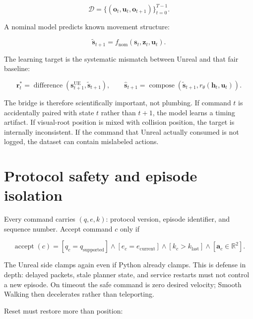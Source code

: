 \documentclass[11pt]{article}
\begin{document}
\begin{equation}
  \mathcal{D}=\{(\mathbf{o}_t,\mathbf{u}_t,\mathbf{o}_{t+1})\}_{t=0}^{T-1}.
\end{equation}

A nominal model predicts known movement structure:

\begin{equation}
  \tilde{\mathbf{s}}_{t+1}=
  f_{\mathrm{nom}}(\mathbf{s}_t,\mathbf{z}_t,\mathbf{u}_t).
\end{equation}

The learning target is the systematic mismatch between Unreal and that fair baseline:

\begin{equation}
  \mathbf{r}^{*}_t =
  \operatorname{difference}\!\left(\mathbf{s}^{\mathrm{UE}}_{t+1},
  \tilde{\mathbf{s}}_{t+1}\right),
  \qquad
  \hat{\mathbf{s}}_{t+1}=
  \operatorname{compose}\!\left(\tilde{\mathbf{s}}_{t+1},r_\theta(\mathbf{h}_t,\mathbf{u}_t)\right).
\end{equation}

The bridge is therefore scientifically important, not plumbing. If command $t$ is accidentally
paired with state $t$ rather than $t+1$, the model learns a timing artifact. If visual-root position
is mixed with collision position, the target is internally inconsistent. If the command that Unreal
actually consumed is not logged, the dataset can contain mislabeled actions.

\section{Protocol safety and episode isolation}\label{sec:safety}

Every command carries $(q,e,k)$: protocol version, episode identifier, and sequence number. Accept
command $c$ only if

\begin{equation}
  \operatorname{accept}(c)=
  [q_c=q_{\mathrm{supported}}]\land[e_c=e_{\mathrm{current}}]
  \land[k_c>k_{\mathrm{last}}]\land[\mathbf{a}_c\in\mathbb{R}^2].
\end{equation}

The Unreal side clamps again even if Python already clamps. This is defense in depth: delayed
packets, stale planner state, and service restarts must not control a new episode. On timeout the
safe command is zero desired velocity; Smooth Walking then decelerates rather than teleporting.

Reset must restore more than position:
\end{document}
